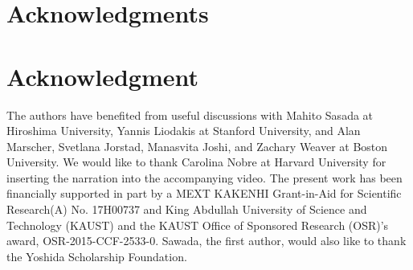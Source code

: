 \documentclass[10pt,journal,compsoc]{IEEEtran}
\begin{document}


\ifCLASSOPTIONcompsoc
  \section*{Acknowledgments}
\else
  \section*{Acknowledgment}
\fi
The authors have benefited from useful discussions with Mahito Sasada at Hiroshima University, Yannis Liodakis at Stanford University, and Alan Marscher, Svetlana Jorstad, Manasvita Joshi, and Zachary Weaver at Boston University.
We would like to thank Carolina Nobre at Harvard University for inserting the narration into the accompanying video.
The present work has been financially supported in part by a MEXT KAKENHI Grant-in-Aid for Scientific Research(A) No. 17H00737 and King Abdullah
University of Science and Technology (KAUST) and the KAUST Office of Sponsored
Research (OSR)'s award, OSR-2015-CCF-2533-0.
Sawada, the first author, would also like to thank the Yoshida Scholarship Foundation.


\ifCLASSOPTIONcaptionsoff
  \newpage
\fi





% 
%
%
\end{document}
